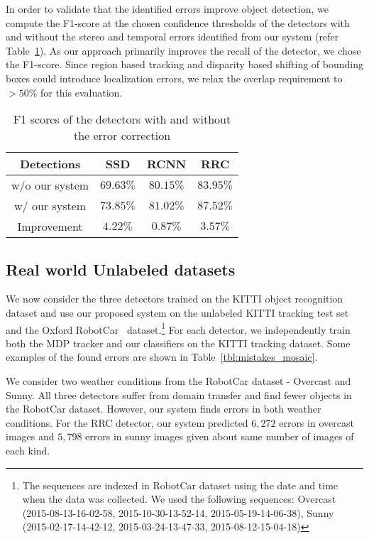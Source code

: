 \documentclass[letterpaper, 10 pt, journal, twoside]{IEEEtran}  %
\begin{document}
In order to validate that the identified errors improve object detection, we compute the F1-score at the chosen confidence thresholds of the detectors with and without the stereo and temporal errors identified from our system (refer Table~\ref{tbl:f1_scores}). As our approach primarily improves the recall of the detector, we chose the F1-score. Since region based tracking and disparity based shifting of bounding boxes could introduce localization errors, we relax the overlap requirement to $>50\%$ for this evaluation. 

\begin{table}[th]
\centering
\setlength\extrarowheight{2pt}
\begin{tabular}{|c|c|c|c|}
\hline
\textbf{Detections} & \textbf{SSD} & \textbf{RCNN} & \textbf{RRC} \\
\hline
w/o our system & $69.63\%$ & $80.15\%$ & $83.95\%$ \\
w/ our system & $73.85\%$ & $81.02\%$ & $87.52\%$ \\
\hline
Improvement & $4.22\%$ & $0.87\%$ & $3.57\%$ \\
\hline
\end{tabular}
\caption{F1 scores of the detectors with and without the error correction}
\label{tbl:f1_scores}
\end{table}

\subsection{Real world Unlabeled datasets}
\label{sec:unlabeled_data}

We now consider the three detectors trained on the KITTI object recognition dataset and use our proposed system on the unlabeled KITTI tracking test set and the Oxford RobotCar~\cite{maddern20171} dataset.\footnote{The sequences are indexed in RobotCar dataset using the date and time when the data was collected. We used the following sequences: Overcast (2015-08-13-16-02-58, 2015-10-30-13-52-14, 2015-05-19-14-06-38), Sunny (2015-02-17-14-42-12, 2015-03-24-13-47-33, 2015-08-12-15-04-18)}
For each detector, we independently train both the MDP tracker and our classifiers on the KITTI tracking dataset. Some examples of the found errors are shown in Table~\ref{tbl:mistakes_mosaic}.

We consider two weather conditions from the RobotCar dataset - Overcast and Sunny. All three detectors suffer from domain transfer and find fewer objects in the RobotCar dataset. However, our system finds errors in both weather conditions. For the RRC detector, our system predicted $6,272$ errors in overcast images and $5,798$ errors in sunny images given about same number of images of each kind.
\end{document}
